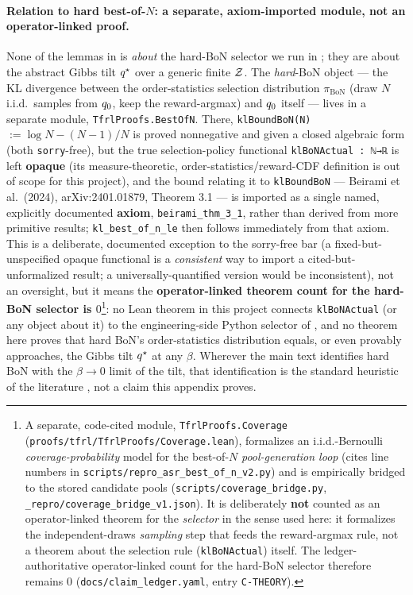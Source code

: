 \paragraph{Relation to hard best-of-$N$: a separate, axiom-imported module, not an operator-linked proof.}
None of the lemmas in  is \emph{about} the hard-BoN selector we run in
; they are about the abstract Gibbs tilt $q^{\star}$ over a generic finite $\mathcal{Z}$. The
\emph{hard}-BoN object --- the KL divergence between the order-statistics selection distribution
$\pi_{\mathrm{BoN}}$ (draw $N$ i.i.d.\ samples from $q_{0}$, keep the reward-argmax) and $q_{0}$ itself ---
lives in a separate module, \texttt{TfrlProofs.BestOfN}. There, \texttt{klBoundBoN(N)} $:=\log N-(N-1)/N$
is proved nonnegative and given a closed algebraic form (both \texttt{sorry}-free), but the true
selection-policy functional \texttt{klBoNActual : ℕ→ℝ} is left \textbf{opaque} (its measure-theoretic,
order-statistics/reward-CDF definition is out of scope for this project), and the bound relating it to
\texttt{klBoundBoN} --- Beirami et al.\ (2024), arXiv:2401.01879, Theorem 3.1 --- is imported as a
single named, explicitly documented \textbf{axiom}, \texttt{beirami\_thm\_3\_1}, rather than derived from
more primitive results; \texttt{kl\_best\_of\_n\_le} then follows immediately from that axiom. This is a
deliberate, documented exception to the sorry-free bar (a fixed-but-unspecified opaque functional is a
\emph{consistent} way to import a cited-but-unformalized result; a universally-quantified version would
be inconsistent), not an oversight, but it means the \textbf{operator-linked theorem count for the
hard-BoN selector is $0$}\footnote{A separate, code-cited module, \texttt{TfrlProofs.Coverage}
(\texttt{proofs/tfrl/TfrlProofs/Coverage.lean}), formalizes an i.i.d.-Bernoulli \emph{coverage-probability}
model for the best-of-$N$ \emph{pool-generation loop} (cites line numbers in
\texttt{scripts/repro\_asr\_best\_of\_n\_v2.py}) and is empirically bridged to the stored candidate pools
(\texttt{scripts/coverage\_bridge.py}, \texttt{\_repro/coverage\_bridge\_v1.json}). It is deliberately
\textbf{not} counted as an operator-linked theorem for the \emph{selector} in the sense used here: it
formalizes the independent-draws \emph{sampling} step that feeds the reward-argmax rule, not a theorem
about the selection rule (\texttt{klBoNActual}) itself. The ledger-authoritative operator-linked count for
the hard-BoN selector therefore remains $0$ (\texttt{docs/claim\_ledger.yaml}, entry \texttt{C-THEORY}).}:
no Lean theorem in this project connects \texttt{klBoNActual} (or any object
about it) to the engineering-side Python selector of , and no theorem here proves
that hard BoN's order-statistics distribution equals, or even provably approaches, the Gibbs tilt $q^{\star}$
at any $\beta$. Wherever the main text identifies hard BoN with the $\beta\to0$ limit of the tilt, that
identification is the standard heuristic of the literature \citep{beirami2024bon}, not a claim this
appendix proves.

